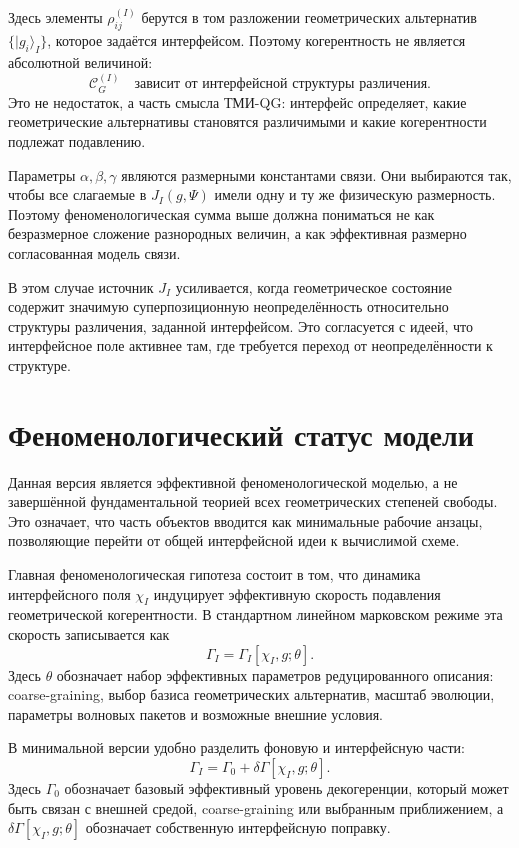 \documentclass[12pt,a4paper]{article}
\begin{document}
Здесь элементы $\rho_{ij}^{(I)}$ берутся в том разложении геометрических альтернатив $\{|g_i\rangle_I\}$, которое задаётся интерфейсом. Поэтому когерентность не является абсолютной величиной:
\[
\boxed{
\mathcal C_G^{(I)}
\quad\text{зависит от интерфейсной структуры различения.}
}
\]
Это не недостаток, а часть смысла ТМИ-QG: интерфейс определяет, какие геометрические альтернативы становятся различимыми и какие когерентности подлежат подавлению.

Параметры $\alpha,\beta,\gamma$ являются размерными константами связи. Они выбираются так, чтобы все слагаемые в $J_I(g,\Psi)$ имели одну и ту же физическую размерность. Поэтому феноменологическая сумма выше должна пониматься не как безразмерное сложение разнородных величин, а как эффективная размерно согласованная модель связи.

В этом случае источник $J_I$ усиливается, когда геометрическое состояние содержит значимую суперпозиционную неопределённость относительно структуры различения, заданной интерфейсом. Это согласуется с идеей, что интерфейсное поле активнее там, где требуется переход от неопределённости к структуре.



\section{Феноменологический статус модели}

Данная версия является эффективной феноменологической моделью, а не завершённой фундаментальной теорией всех геометрических степеней свободы. Это означает, что часть объектов вводится как минимальные рабочие анзацы, позволяющие перейти от общей интерфейсной идеи к вычислимой схеме.

Главная феноменологическая гипотеза состоит в том, что динамика интерфейсного поля $\chi_I$ индуцирует эффективную скорость подавления геометрической когерентности. В стандартном линейном марковском режиме эта скорость записывается как
\[
\boxed{
\Gamma_I=\Gamma_I[\chi_I,g;\theta].
}
\]
Здесь $\theta$ обозначает набор эффективных параметров редуцированного описания: coarse-graining, выбор базиса геометрических альтернатив, масштаб эволюции, параметры волновых пакетов и возможные внешние условия.

В минимальной версии удобно разделить фоновую и интерфейсную части:
\[
\boxed{
\Gamma_I
=
\Gamma_0
+
\delta\Gamma[\chi_I,g;\theta].
}
\]
Здесь $\Gamma_0$ обозначает базовый эффективный уровень декогеренции, который может быть связан с внешней средой, coarse-graining или выбранным приближением, а $\delta\Gamma[\chi_I,g;\theta]$ обозначает собственную интерфейсную поправку.
\end{document}
